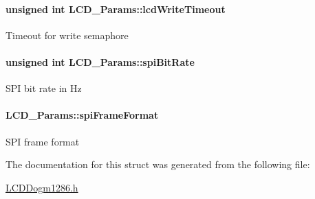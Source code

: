 \paragraph[{lcd\+Write\+Timeout}]{\setlength{\rightskip}{0pt plus 5cm}unsigned int L\+C\+D\+\_\+\+Params\+::lcd\+Write\+Timeout}\label{struct_l_c_d___params_a4d0eed4a93a0785c12eb26c48be77a28}
Timeout for write semaphore 
\paragraph[{spi\+Bit\+Rate}]{\setlength{\rightskip}{0pt plus 5cm}unsigned int L\+C\+D\+\_\+\+Params\+::spi\+Bit\+Rate}\label{struct_l_c_d___params_a5670d1d33180c428d0b84154ca658098}
S\+P\+I bit rate in Hz 
\paragraph[{spi\+Frame\+Format}]{ L\+C\+D\+\_\+\+Params\+::spi\+Frame\+Format}\label{struct_l_c_d___params_a27584b38ae256abf6358c4158da5be60}
S\+P\+I frame format 

The documentation for this struct was generated from the following file\+:\begin{DoxyCompactItemize}
\item 
\hyperlink{_l_c_d_dogm1286_8h}{L\+C\+D\+Dogm1286.\+h}\end{DoxyCompactItemize}
